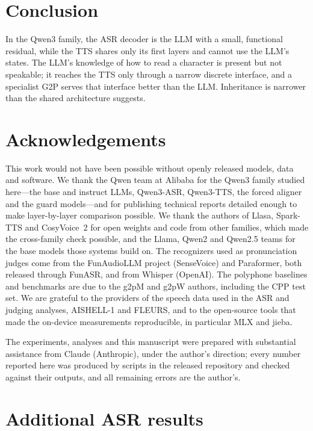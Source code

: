 \documentclass[11pt]{article}
\begin{document}
\section{Conclusion}
In the Qwen3 family, the ASR decoder is the LLM with a small, functional residual, while the TTS shares only its first layers and cannot use the LLM's states. The LLM's knowledge of how to read a character is present but not speakable; it reaches the TTS only through a narrow discrete interface, and a specialist G2P serves that interface better than the LLM. Inheritance is narrower than the shared architecture suggests.

\section*{Acknowledgements}
This work would not have been possible without openly released models, data and software. We thank the Qwen team at Alibaba for the Qwen3 family studied here---the base and instruct LLMs, Qwen3-ASR, Qwen3-TTS, the forced aligner and the guard models---and for publishing technical reports detailed enough to make layer-by-layer comparison possible. We thank the authors of Llasa, Spark-TTS and CosyVoice~2 for open weights and code from other families, which made the cross-family check possible, and the Llama, Qwen2 and Qwen2.5 teams for the base models those systems build on. The recognizers used as pronunciation judges come from the FunAudioLLM project (SenseVoice) and Paraformer, both released through FunASR, and from Whisper (OpenAI). The polyphone baselines and benchmarks are due to the g2pM and g2pW authors, including the CPP test set. We are grateful to the providers of the speech data used in the ASR and judging analyses, AISHELL-1 and FLEURS, and to the open-source tools that made the on-device measurements reproducible, in particular MLX and jieba.

The experiments, analyses and this manuscript were prepared with substantial assistance from Claude (Anthropic), under the author's direction; every number reported here was produced by scripts in the released repository and checked against their outputs, and all remaining errors are the author's.




\appendix
\section{Additional ASR results}
\label{app:asr}
\end{document}
